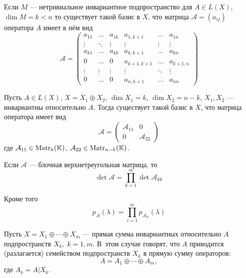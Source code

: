 \begin{lemma}
    Если $M$ --- нетривиальное инвариантное подпространство для $A \in L(X)$,
    $\dim M = k < n$ то существует такой базис в $X$, что матрица $\mathcal{A} = (a_{ij})$ оператора
    $A$ имеет в нём вид
    \[ \mathcal{A} =  
        \begin{pmatrix}
            a_{11} & \ldots & a_{1k} & a_{1,k+1}   & \ldots & a_{1n} \\
            \vdots & \ddots & \vdots & \vdots      & \vdots & \vdots \\
            a_{k1} & \ldots & a_{kk} & a_{k,k+1}   & \ldots & a_{kn} \\
            0      & \ldots & 0      & a_{k+1,k+1} & \ldots & a_{k+1,n} \\
            \vdots & \vdots & \vdots & \vdots      & \ddots & \vdots \\
            0      & \ldots & 0      & a_{n,k+1}   & \ldots & a_{nn}
        \end{pmatrix}
    \]
\end{lemma}

\begin{lemma}
    Пусть $A \in L(X)$, $X = X_1 \oplus X_2$, $\dim X_1 = k$, $\dim X_2 = n-k$, $X_1, X_2$ --- инвариантны
    относительно $A$. Тогда существует такой базис в $X$, что матрица оператора
    имеет вид
    \[ \mathcal{A} =
        \begin{pmatrix}
            \mathcal{A}_{11} & 0 \\
            0                & \mathcal{A}_{22}
        \end{pmatrix}
    \] где $\mathcal{A}_{11} \in \mathrm{Matr}_{k}({\mathbb{K}})$, $\mathcal{A}_{22} \in \mathrm{Matr}_{n-k}({\mathbb{K}})$.
\end{lemma}

\begin{theorem}\label{th:blockmatrixpoly}
    Если $\mathcal{A}$ --- блочная верхнетреугольная матрица, то
    \[ \det \mathcal{A} = \prod_{k=1}^m \det \mathcal{A}_{kk} \]

    Кроме того
    \[ p_\mathcal{A}(\lambda) = \prod_{i=1}^m p_{\mathcal{A}_{ii}}(\lambda) \]
\end{theorem}

\begin{definition}
    Пусть $X = X_1 \oplus \dotsb \oplus X_m$ — прямая сумма инвариантных
    относительно $A$ подпространств $X_k, \; k = \overline{1,m}$. В~этом 
    случае говорят, что $A$ приводится (разлагается) семейством
    подпространств $X_k$ в прямую сумму операторов:
    \[ A = A_1 \oplus \dotsb \oplus A_m, \]
    где $A_k = A \vert X_k$.
\end{definition}

